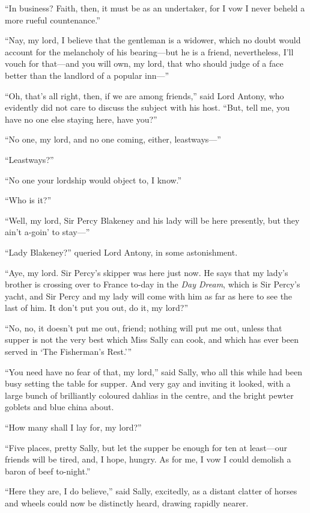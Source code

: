 \documentclass[paper=a5,BCOR=7mm,twoside,DIV=calc,12pt,usegeometry,chapterprefix,endperiod,headings=big]{scrbook}
\begin{document}
\enquote{In business? Faith, then, it must be as an undertaker, for I vow I never beheld a more rueful countenance.}

\enquote{Nay, my lord, I believe that the gentleman is a widower, which no doubt would account for the melancholy of his bearing---but he is a friend, nevertheless, I'll vouch for that---and you will own, my lord, that who should judge of a face better than the landlord of a popular inn---}

\enquote{Oh, that's all right, then, if we are among friends,} said Lord Antony, who evidently did not care to discuss the subject with his host. \enquote{But, tell me, you have no one else staying here, have you?}

\enquote{No one, my lord, and no one coming, either,  leastways---}

\enquote{Leastways?}

\enquote{No one your lordship would object to, I know.}

\enquote{Who is it?}

\enquote{Well, my lord, Sir Percy Blakeney and his lady will be here presently, but they ain't a-goin’ to stay---}

\enquote{Lady Blakeney?} queried Lord Antony, in some astonishment.

\enquote{Aye, my lord. Sir Percy's skipper was here just now. He says that my lady's brother is crossing over to France to-day in the \textit{Day Dream}, which is Sir Percy's yacht, and Sir Percy and my lady will come with him as far as here to see the last of him. It don't put you out, do it, my lord?}

\enquote{No, no, it doesn't put me out, friend; nothing will put me out, unless that supper is not the very best which Miss Sally can cook, and which has ever been served in \enquote{The Fisherman's Rest.}}

\enquote{You need have no fear of that, my lord,} said Sally, who all this while had been busy setting the table for supper. And very gay and inviting it looked, with a large bunch of brilliantly coloured dahlias in the centre, and the bright pewter goblets and blue china about.

\enquote{How many shall I lay for, my lord?}

\enquote{Five places, pretty Sally, but let the supper be enough for ten at least---our friends will be tired, and, I hope, hungry. As for me, I vow I could demolish a baron of beef to-night.}

\enquote{Here they are, I do believe,} said Sally, excitedly, as a distant clatter of horses and wheels could now be distinctly heard, drawing rapidly nearer.
\end{document}
